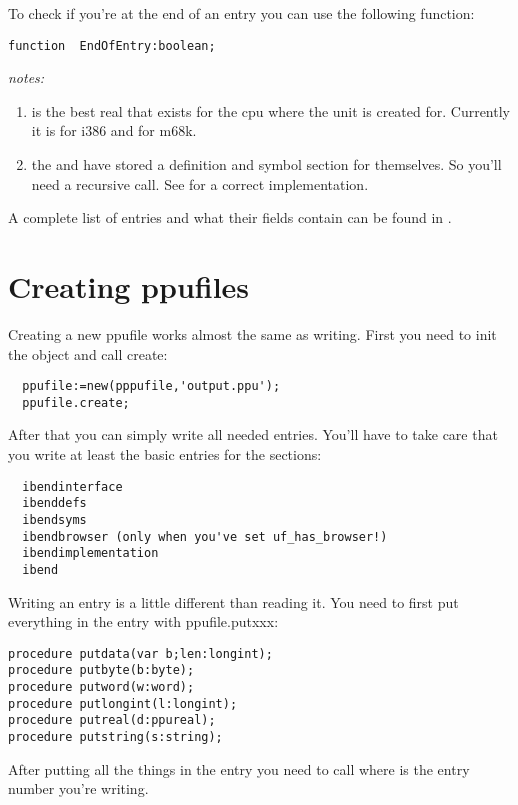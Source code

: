 \documentclass{report}
\begin{document}
To check if you're at the end of an entry you can use the following
function:

\begin{verbatim}
function  EndOfEntry:boolean;
\end{verbatim}
{\em notes:}
\begin{enumerate}
\item {} is the best real that exists for the cpu where the
unit is created for. Currently it is  for i386 and
 for m68k.
\item the  and  have stored a definition
and symbol section for themselves. So you'll need a recursive call. See
 for a correct implementation.
\end{enumerate}

A complete list of entries and what their fields contain can be found
in .

\section{Creating ppufiles}

Creating a new ppufile works almost the same as writing. First you need
to init the object and call create:
\begin{verbatim}
  ppufile:=new(pppufile,'output.ppu');
  ppufile.create;
\end{verbatim}

After that you can simply write all needed entries. You'll have to take
care that you write at least the basic entries for the sections:
\begin{verbatim}
  ibendinterface
  ibenddefs
  ibendsyms
  ibendbrowser (only when you've set uf_has_browser!)
  ibendimplementation
  ibend
\end{verbatim}

Writing an entry is a little different than reading it. You need to first
put everything in the entry with ppufile.putxxx:
\begin{verbatim}
procedure putdata(var b;len:longint);
procedure putbyte(b:byte);
procedure putword(w:word);
procedure putlongint(l:longint);
procedure putreal(d:ppureal);
procedure putstring(s:string);
\end{verbatim}

After putting all the things in the entry you need to call
 where  is the entry number
you're writing.
\end{document}
